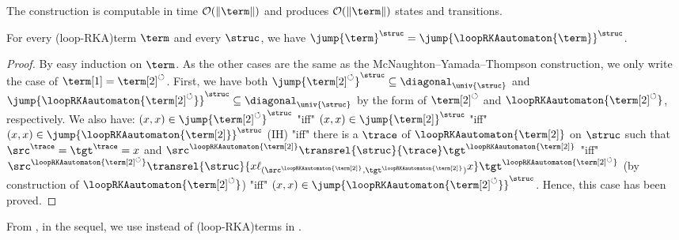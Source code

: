 \documentclass[a4paper,UKenglish,cleveref, autoref, thm-restate]{lipics-v2021}
\DeclarePairedDelimiter\tuple{(}{)}
\newcommand{\lop}{\circlearrowleft}
\begin{document}
The construction is computable in time $\mathcal{O}(\|\term\|)$ and produces
$\mathcal{O}(\|\term\|)$ states and transitions.

\begin{proposition}\label{prop: automata}
    For every \kl(loop-RKA){term} $\term$ and every  $\struc$,
    we have $\jump{\term}^{\struc} = \jump{\loopRKAautomaton{\term}}^{\struc}$.
\end{proposition}
\begin{proof}
    By easy induction on $\term$.
    As the other cases are the same as the McNaughton--Yamada--Thompson construction,
    we only write the case of $\term[1] = \term[2]^{\lop}$.
    First, we have both $\jump{\term[2]^{\lop}}^{\struc} \subseteq \diagonal_{\univ{\struc}}$ and $\jump{\loopRKAautomaton{\term[2]^{\lop}}}^{\struc} \subseteq \diagonal_{\univ{\struc}}$ by the form of $\term[2]^{\lop}$ and $\loopRKAautomaton{\term[2]^{\lop}}$, respectively.
    We also have:
    $\tuple{x, x} \in \jump{\term[2]^{\lop}}^{\struc}$ "iff"
    $\tuple{x, x} \in \jump{\term[2]}^{\struc}$ "iff"
    $\tuple{x, x} \in \jump{\loopRKAautomaton{\term[2]}}^{\struc}$ (IH) "iff"
    there is a  $\trace$ of $\loopRKAautomaton{\term[2]}$ on $\struc$ such that $\src^{\trace} = \tgt^{\trace} = x$
    and $\src^{\loopRKAautomaton{\term[2]}} \transrel{\struc}{\trace} \tgt^{\loopRKAautomaton{\term[2]}}$
    "iff"
    $\src^{\loopRKAautomaton{\term[2]^{\lop}}}
    \transrel{\struc}{x \ell_{\tuple{\src^{\loopRKAautomaton{\term[2]}}, \tgt^{\loopRKAautomaton{\term[2]}}}} x}
    \tgt^{\loopRKAautomaton{\term[2]^{\lop}}}$ (by construction of $\loopRKAautomaton{\term[2]^{\lop}}$) "iff"
    $\tuple{x, x} \in \jump{\loopRKAautomaton{\term[2]^{\lop}}}^{\struc}$.
    Hence, this case has been proved.
\end{proof}
From ,
in the sequel,
we use  instead of \kl(loop-RKA){terms} in .
%
\end{document}
